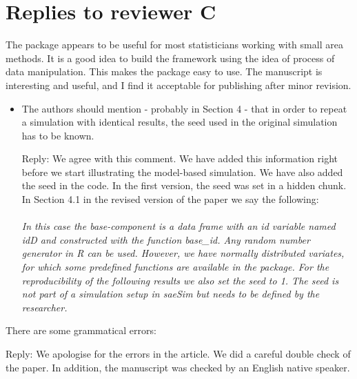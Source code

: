 \documentclass[11pt]{article}
\begin{document}
\pagebreak
\section*{Replies to reviewer C}

The package appears to be useful for most statisticians working with small area methods. It is a good idea to build the framework using the idea of process of data manipulation. This makes the package easy to use. The manuscript is interesting and useful, and I find it acceptable for
publishing after minor revision.

\begin{itemize}
\item
	The authors should mention - probably in Section 4 - that in order to repeat a simulation with identical results, the seed used in the original simulation has to be known.
	
	Reply: We agree with this comment. We have added this information right before we start illustrating the model-based simulation. We have also added the seed in the code. In the first version, the seed was set in a hidden chunk. In Section 4.1 in the revised version of the paper we say the following:\\\\
	\textit{In this case the \textit{base-component} is a data frame with an id variable named idD and constructed with the function base\_id. Any random number generator in R can be used. However, we have normally distributed variates, for which some predefined functions are available in the package. For the reproducibility of the following results we also set the seed to 1. The seed is not part of a simulation setup in saeSim but needs to be defined by the researcher.}
	
\end{itemize}

\vspace{0.5cm}

\noindent There are some grammatical errors:

\noindent Reply: We apologise for the errors in the article. We did a careful double check of the paper. In addition, the manuscript was checked by an English native speaker.
\end{document}
